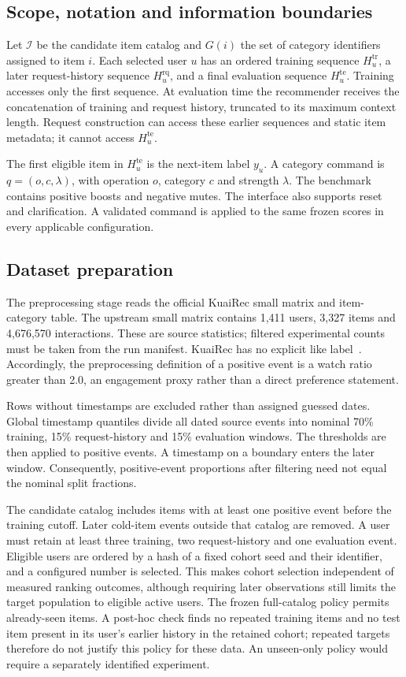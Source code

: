 \documentclass[conference]{IEEEtran}
\begin{document}
\subsection{Scope, notation and information boundaries}
Let $\mathcal I$ be the candidate item catalog and $G(i)$ the set of category identifiers assigned to item $i$. Each selected user $u$ has an ordered training sequence $H_u^{\mathrm{tr}}$, a later request-history sequence $H_u^{\mathrm{rq}}$, and a final evaluation sequence $H_u^{\mathrm{te}}$. Training accesses only the first sequence. At evaluation time the recommender receives the concatenation of training and request history, truncated to its maximum context length. Request construction can access these earlier sequences and static item metadata; it cannot access $H_u^{\mathrm{te}}$.

The first eligible item in $H_u^{\mathrm{te}}$ is the next-item label $y_u$. A category command is $q=(o,c,\lambda)$, with operation $o$, category $c$ and strength $\lambda$. The benchmark contains positive boosts and negative mutes. The interface also supports reset and clarification. A validated command is applied to the same frozen scores in every applicable configuration.

\subsection{Dataset preparation}
The preprocessing stage reads the official KuaiRec small matrix and item-category table. The upstream small matrix contains 1,411 users, 3,327 items and 4,676,570 interactions. These are source statistics; filtered experimental counts must be taken from the run manifest. KuaiRec has no explicit like label~\cite{kuairecdocs}. Accordingly, the preprocessing definition of a positive event is a watch ratio greater than 2.0, an engagement proxy rather than a direct preference statement.

Rows without timestamps are excluded rather than assigned guessed dates. Global timestamp quantiles divide all dated source events into nominal 70\% training, 15\% request-history and 15\% evaluation windows. The thresholds are then applied to positive events. A timestamp on a boundary enters the later window. Consequently, positive-event proportions after filtering need not equal the nominal split fractions.

The candidate catalog includes items with at least one positive event before the training cutoff. Later cold-item events outside that catalog are removed. A user must retain at least three training, two request-history and one evaluation event. Eligible users are ordered by a hash of a fixed cohort seed and their identifier, and a configured number is selected. This makes cohort selection independent of measured ranking outcomes, although requiring later observations still limits the target population to eligible active users. The frozen full-catalog policy permits already-seen items. A post-hoc check finds no repeated training items and no test item present in its user's earlier history in the retained cohort; repeated targets therefore do not justify this policy for these data. An unseen-only policy would require a separately identified experiment.
\end{document}
